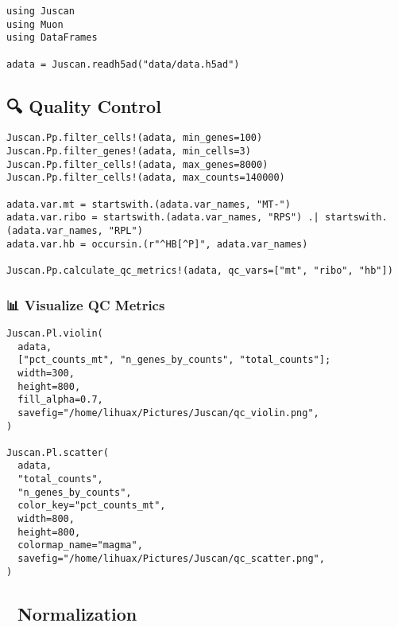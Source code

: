 \documentclass[oneside]{memoir}
\begin{document}
\begin{verbatim}
using Juscan
using Muon
using DataFrames

adata = Juscan.readh5ad("data/data.h5ad")
\end{verbatim}



\subsection{🔍 Quality Control}



\label{5697303154653018679}{}



\begin{verbatim}
Juscan.Pp.filter_cells!(adata, min_genes=100)
Juscan.Pp.filter_genes!(adata, min_cells=3)
Juscan.Pp.filter_cells!(adata, max_genes=8000)
Juscan.Pp.filter_cells!(adata, max_counts=140000)

adata.var.mt = startswith.(adata.var_names, "MT-")
adata.var.ribo = startswith.(adata.var_names, "RPS") .| startswith.(adata.var_names, "RPL")
adata.var.hb = occursin.(r"^HB[^P]", adata.var_names)

Juscan.Pp.calculate_qc_metrics!(adata, qc_vars=["mt", "ribo", "hb"])
\end{verbatim}



\subsubsection{📊 Visualize QC Metrics}



\label{18287271198092503872}{}



\begin{verbatim}
Juscan.Pl.violin(
  adata,
  ["pct_counts_mt", "n_genes_by_counts", "total_counts"];
  width=300,
  height=800,
  fill_alpha=0.7,
  savefig="/home/lihuax/Pictures/Juscan/qc_violin.png",
)

Juscan.Pl.scatter(
  adata,
  "total_counts",
  "n_genes_by_counts",
  color_key="pct_counts_mt",
  width=800,
  height=800,
  colormap_name="magma",
  savefig="/home/lihuax/Pictures/Juscan/qc_scatter.png",
)
\end{verbatim}



\subsection{🔬 Normalization}
\end{document}
